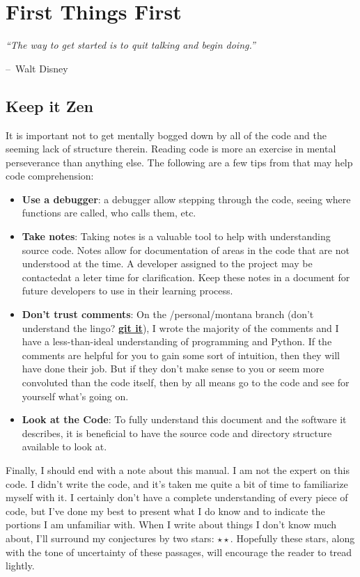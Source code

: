 \documentclass{report}
\makeatletter
\newenvironment{chapquote}[2][2em]
  {\setlength{\@tempdima}{#1}%
   \def\chapquote@author{#2}%
   \parshape 1 \@tempdima \dimexpr\textwidth-2\@tempdima\relax%
   \itshape}
  {\par\normalfont\hfill--\ \chapquote@author\hspace*{\@tempdima}\par\bigskip}
\newcommand{\dstar}{$\star\star$}	%
\makeatother
\begin{document}
\chapter{First Things First}
\begin{chapquote}{Walt Disney \textit{}}
``The way to get started is to quit talking and begin doing.''
\end{chapquote}

\section{Keep it Zen}
It is important not to get mentally bogged down by all of the code and the seeming lack of structure therein. Reading code is more an exercise in mental perseverance than anything else. The following are a few tips from that may help code comprehension:
	\begin{itemize}
	\item \textbf{Use a debugger}: a debugger allow stepping through the code, seeing where functions are called, who calls them, etc.
	\item \textbf{Take notes}: Taking notes is a valuable tool to help with understanding source code. Notes allow for documentation of areas in the code that are not understood at the time. A developer assigned to the project may be contactedat a leter time for clarification. Keep these notes in a document for future developers to use in their learning process.
	\item \textbf{Don't trust comments}: On the /personal/montana branch (don't understand the lingo? \hyperref[app:git]{\textbf{git it}}), I wrote the majority of the comments and I have a less-than-ideal understanding of programming and Python. If the comments are helpful for you to gain some sort of intuition, then they will have done their job. But if they don't make sense to you or seem more convoluted than the code itself, then by all means go to the code and see for yourself what's going on.
	\item \textbf{Look at the Code}: To fully understand this document and the software it describes, it is beneficial to have the source code and directory structure available to look at.
	\end{itemize}
Finally, I should end with a note about this manual. I am not the expert on this code. I didn't write the code, and it's taken me quite a bit of time to familiarize myself with it. I certainly don't have a complete understanding of every piece of code, but I've done my best to present what I do know and to indicate the portions I am unfamiliar with. When I write about things I don't know much about, I'll surround my conjectures by two stars: \dstar. Hopefully these stars, along with the tone of uncertainty of these passages, will encourage the reader to tread lightly.
\end{document}
